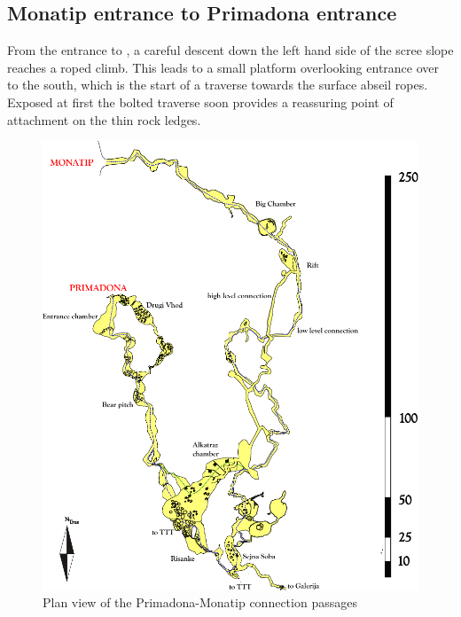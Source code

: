 \subsection{Monatip entrance to Primadona entrance}
From the entrance to , a careful descent down the left hand side of the scree slope reaches a roped climb. This leads to a small platform overlooking  entrance over to the south, which is the start of a traverse towards the surface abseil ropes. Exposed at first  the bolted traverse soon provides a reassuring point of attachment on the thin rock ledges.


\begin{figure}[t!]
\centering
\includegraphics[height=\textheight]{images/pdf_maps/prima-mona-trip.pdf}
\caption{Plan view of the Primadona-Monatip connection passages}
\label{prima mona trip}
\end{figure}
